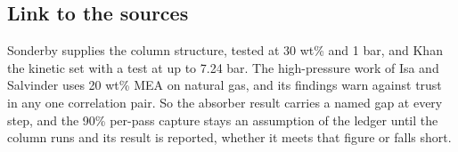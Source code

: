 \subsection*{Link to the sources}
Sonderby supplies the column structure, tested at 30 wt\% and 1 bar, and Khan the kinetic set with a test at up to 7.24 bar. The high-pressure work of Isa and Salvinder uses 20 wt\% MEA on natural gas, and its findings warn against trust in any one correlation pair. So the absorber result carries a named gap at every step, and the 90\% per-pass capture stays an assumption of the ledger until the column runs and its result is reported, whether it meets that figure or falls short.
